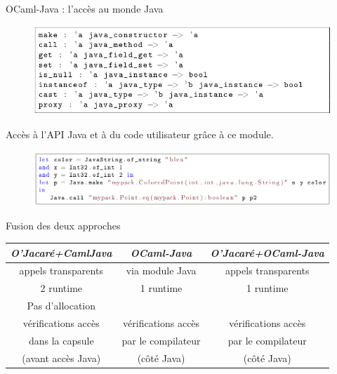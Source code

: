 \documentclass{beamer}
\begin{document}
\begin{frame}{OCaml-Java : l'accès au monde Java}
\begin{figure}[h]
  \centering
  \includegraphics[scale=0.33]{methModuleJava.png}
\end{figure}

Accès à l'API Java et à du code utilisateur grâce à ce module.
\begin{figure}[h]
  \centering
  \includegraphics[scale=0.30]{exempleOCaml-Java.png}
\end{figure}

\end{frame}


\begin{frame}{Fusion des deux approches}

\begin{tabular}{|c|c|c|}
  \hline
   \emph{O'Jacaré+CamlJava} & \emph{OCaml-Java} & \emph{O'Jacaré+OCaml-Java}\\
  \hline
  appels transparents & via module Java & appels transparents\\\hline
  2 runtime & 1 runtime & 1 runtime \\\hline
  Pas d'allocation & & \\\hline
  vérifications accès & vérifications accès & vérifications accès \\
  dans la capsule & par le compilateur & par le compilateur\\
  (avant accès Java) & (côté Java) & (côté Java) \\ \hline
\end{tabular}

\end{frame}
\end{document}
